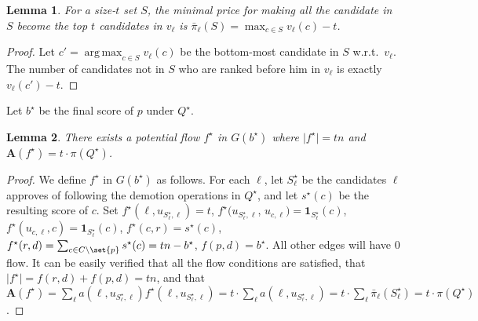 \documentclass[letterpaper]{article} %
\DeclareMathOperator*{\argmax}{arg\,max}
\newtheorem{lemma}{Lemma}
\newcommand{\indic}{\mathbf{1}}
\newcommand{\vecc}{\mathbf}
\newcommand{\Cmp}{C \setminus \set{p}}
\newcommand{\abs}[1]{\lvert{#1}\rvert}
\newcommand{\Aoper}[1]{\vecc{A}({#1})}
\begin{document}
\begin{lemma} \label{edgesCostsLemma}
For a size-$t$ set $S$, the minimal price for making all the candidate in $S$ become the top $t$ candidates in $v_\ell$ is $\bar{\pi}_{\ell}(S)=\max_{c \in S}v_\ell(c)-t$.
\end{lemma}
\begin{proof}
Let $c' = \argmax_{c \in S}v_\ell(c)$ be the bottom-most candidate in $S$ w.r.t.\ $v_{\ell}$. The number of candidates not in $S$ who are ranked before him in $v_\ell$ is exactly $v_\ell(c')-t$.
\end{proof}
Let $b^\star$ be the final score of $p$ under  $Q^\star$.
\begin{lemma}\label{flowIsMaximal}
There exists a potential flow $f^\star$ in $G(b^\star)$ where $\abs{f^\star} = tn$ and $\Aoper{f^\star} = t\cdot \pi(Q^\star)$.
\end{lemma}
\begin{proof}
 We define $f^\star$ in $G(b^\star)$ as follows. For each $\ell$, let $S^\star_\ell$ be the candidates $\ell$ approves of following the demotion operations in $Q^\star$, and let $s^\star(c)$ be the resulting score of $c$. Set $f^\star(\ell, u_{S^\star_\ell,\ell}) = t$, $f^\star(u_{S^\star_\ell,\ell}$, $u_{c,\ell}) = \indic_{S^\star_{\ell}}(c)$, $f^\star(u_{c,\ell},c) = \indic_{S^\star_{\ell}}(c)$, $f^\star(c,r) = s^\star(c)$, $f^\star(r,d)=\sum_{c \in \Cmp}s^\star(c)=tn-b^\star$,  $f(p,d)=b^\star$. All other edges will have $0$ flow. It can be easily verified that all the flow conditions are satisfied, that $\abs{f^\star} = f(r,d)+f(p,d) = tn$, and that $\Aoper{f^\star} =  \sum_{\ell}a(\ell, u_{S^\star_\ell, \ell})f^\star(\ell, u_{S^\star_\ell, \ell})= t \cdot \sum_{\ell}a(\ell, u_{S^\star_\ell, \ell}) =  t \cdot \sum_{\ell}\bar{\pi}_{\ell}(S^\star_\ell)= t\cdot \pi(Q^\star)$.
\end{proof}
\end{document}
